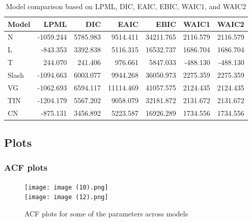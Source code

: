 \documentclass[10.5pt]{article} %
\begin{document}
\begin{table}[ht]
\centering
\caption{Model comparison based on LPML, DIC, EAIC, EBIC, WAIC1, and WAIC2}
\begin{tabular}{lrrrrrr}
\hline
\textbf{Model} & \textbf{LPML} & \textbf{DIC} & \textbf{EAIC} & \textbf{EBIC} & \textbf{WAIC1} & \textbf{WAIC2} \\
\hline
N     & -1059.244 & 5785.983 & 9514.411 & 34211.765 & 2116.579 & 2116.579 \\
L    & -843.353  & 3392.838 & 5116.315 & 16532.737 & 1686.704 & 1686.704 \\
T     & 244.070   & 241.406  & 976.661  & 5847.033  & -488.130 & -488.130 \\
Slash & -1094.663 & 6003.077 & 9944.268 & 36050.973 & 2275.359 & 2275.359 \\
VG    & -1062.693 & 6594.117 & 11114.469 & 41057.575 & 2124.435 & 2124.435 \\
TIN   & -1204.179 & 5567.202 & 9058.079 & 32181.872 & 2131.672 & 2131.672 \\
CN    & -875.131  & 3456.892 & 5223.587 & 16926.289 & 1734.556 & 1734.556 \\
\hline
\end{tabular}
\label{tab:model_comparison}
\end{table}

\subsection{Plots}

\subsubsection{ACF plots}

\begin{figure}[h!]
    \centering
    \texttt{[image: image (10).png]} \\
    \vspace{1em}
    \texttt{[image: image (12).png]}
    \caption{ACF plots for some of the parameters across models}
    \label{fig:vertical_images}
\end{figure}
\end{document}
